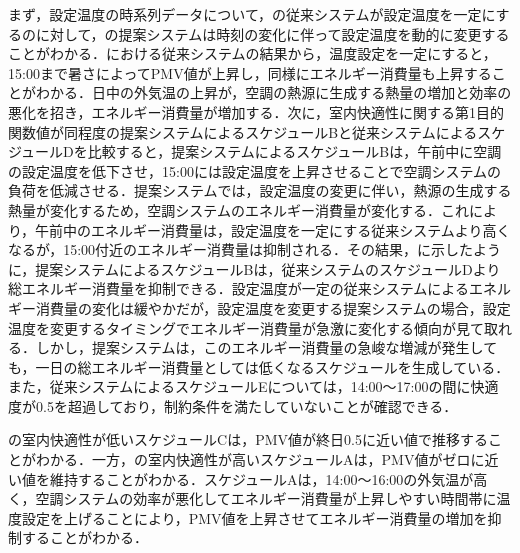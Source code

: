 まず，設定温度の時系列データについて，の従来システムが設定温度を一定にするのに対して，の提案システムは時刻の変化に伴って設定温度を動的に変更することがわかる．における従来システムの結果から，温度設定を一定にすると，15:00まで暑さによってPMV値が上昇し，同様にエネルギー消費量も上昇することがわかる．日中の外気温の上昇が，空調の熱源に生成する熱量の増加と効率の悪化を招き，エネルギー消費量が増加する．次に，室内快適性に関する第1目的関数値が同程度の提案システムによるスケジュールBと従来システムによるスケジュールDを比較すると，提案システムによるスケジュールBは，午前中に空調の設定温度を低下させ，15:00には設定温度を上昇させることで空調システムの負荷を低減させる．提案システムでは，設定温度の変更に伴い，熱源の生成する熱量が変化するため，空調システムのエネルギー消費量が変化する．これにより，午前中のエネルギー消費量は，設定温度を一定にする従来システムより高くなるが，15:00付近のエネルギー消費量は抑制される．その結果，に示したように，提案システムによるスケジュールBは，従来システムのスケジュールDより総エネルギー消費量を抑制できる．設定温度が一定の従来システムによるエネルギー消費量の変化は緩やかだが，設定温度を変更する提案システムの場合，設定温度を変更するタイミングでエネルギー消費量が急激に変化する傾向が見て取れる．しかし，提案システムは，このエネルギー消費量の急峻な増減が発生しても，一日の総エネルギー消費量としては低くなるスケジュールを生成している．また，従来システムによるスケジュールEについては，14:00～17:00の間に快適度が0.5を超過しており，制約条件を満たしていないことが確認できる．

の室内快適性が低いスケジュールCは，PMV値が終日0.5に近い値で推移することがわかる．一方，の室内快適性が高いスケジュールAは，PMV値がゼロに近い値を維持することがわかる．スケジュールAは，14:00～16:00の外気温が高く，空調システムの効率が悪化してエネルギー消費量が上昇しやすい時間帯に温度設定を上げることにより，PMV値を上昇させてエネルギー消費量の増加を抑制することがわかる．

